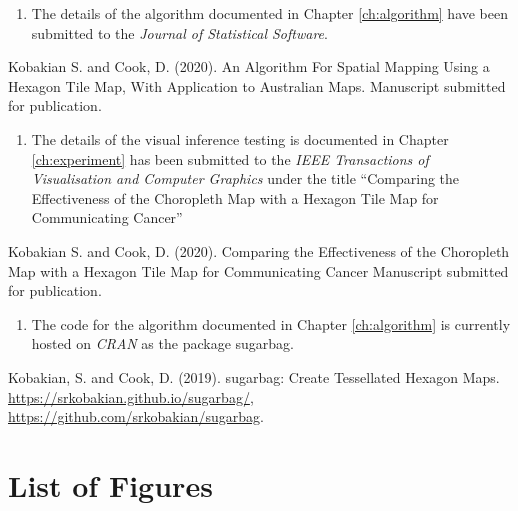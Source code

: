 \documentclass{monashthesis}
\begin{document}
\begin{enumerate}
\def\labelenumi{\arabic{enumi}.}
\setcounter{enumi}{1}
\tightlist
\item
  The details of the algorithm documented in Chapter \ref{ch:algorithm} have been submitted to the \emph{Journal of Statistical Software}.
\end{enumerate}

Kobakian S. and Cook, D. (2020). An Algorithm For Spatial Mapping Using a Hexagon Tile Map, With Application to Australian Maps. Manuscript submitted for publication.

\begin{enumerate}
\def\labelenumi{\arabic{enumi}.}
\setcounter{enumi}{2}
\tightlist
\item
  The details of the visual inference testing is documented in Chapter \ref{ch:experiment} has been submitted to the \emph{IEEE Transactions of Visualisation and Computer Graphics} under the title ``Comparing the Effectiveness of the Choropleth Map with a Hexagon Tile Map for Communicating Cancer''
\end{enumerate}

Kobakian S. and Cook, D. (2020). Comparing the Effectiveness of the Choropleth Map
with a Hexagon Tile Map for Communicating Cancer Manuscript submitted for publication.

\begin{enumerate}
\def\labelenumi{\arabic{enumi}.}
\setcounter{enumi}{3}
\tightlist
\item
  The code for the algorithm documented in Chapter \ref{ch:algorithm} is currently hosted on \emph{CRAN} as the package sugarbag.
\end{enumerate}

Kobakian, S. and Cook, D. (2019). sugarbag: Create Tessellated Hexagon Maps. \url{https://srkobakian.github.io/sugarbag/}, \url{https://github.com/srkobakian/sugarbag}.

\clearpage{}\setcounter{page}{0}

\hypertarget{list-of-figures}{%
\chapter*{List of Figures}\label{list-of-figures}}
\end{document}
